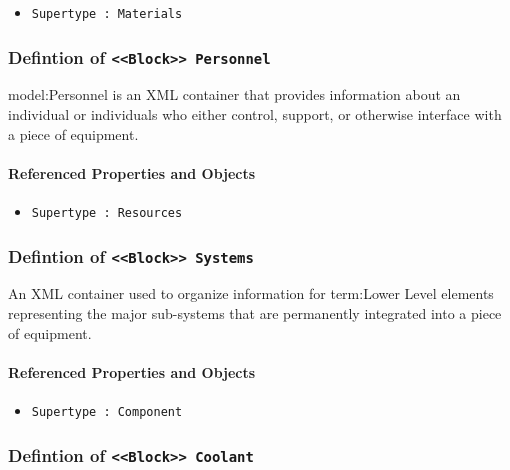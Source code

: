 \begin{itemize}
\item \texttt{Supertype : Materials}

\end{itemize}
\FloatBarrier
\subsubsection{Defintion of \texttt{<<Block>> Personnel}}
  \label{type:Personnel}

\FloatBarrier

{model:Personnel} is an XML container that provides information about an individual or individuals who either control, support, or otherwise interface with a piece of equipment.


\FloatBarrier
\paragraph{Referenced Properties and Objects}

\begin{itemize}
\item \texttt{Supertype : Resources}

\end{itemize}
\FloatBarrier
\subsubsection{Defintion of \texttt{<<Block>> Systems}}
  \label{type:Systems}

\FloatBarrier

An XML container used to organize information for {term:Lower Level} elements representing the major sub-systems that are permanently integrated into a piece of equipment.

\FloatBarrier
\paragraph{Referenced Properties and Objects}

\begin{itemize}
\item \texttt{Supertype : Component}

\end{itemize}
\FloatBarrier
\subsubsection{Defintion of \texttt{<<Block>> Coolant}}
  \label{type:Coolant}

